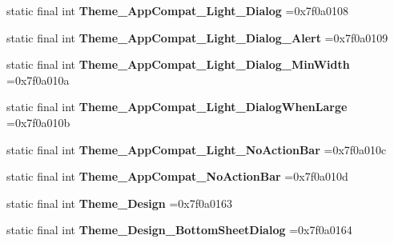 \begin{DoxyCompactItemize}
\item 
\mbox{\label{classproject4_1_1xaria_1_1R_1_1style_aaa524f5b7ae8038afec6da41ae3052c0}} 
static final int {\bfseries Theme\+\_\+\+App\+Compat\+\_\+\+Light\+\_\+\+Dialog} =0x7f0a0108
\item 
\mbox{\label{classproject4_1_1xaria_1_1R_1_1style_a3c1c388a229f2c9ee0b109650884f199}} 
static final int {\bfseries Theme\+\_\+\+App\+Compat\+\_\+\+Light\+\_\+\+Dialog\+\_\+\+Alert} =0x7f0a0109
\item 
\mbox{\label{classproject4_1_1xaria_1_1R_1_1style_ab0a0b62706256c4ed32d64b705a91343}} 
static final int {\bfseries Theme\+\_\+\+App\+Compat\+\_\+\+Light\+\_\+\+Dialog\+\_\+\+Min\+Width} =0x7f0a010a
\item 
\mbox{\label{classproject4_1_1xaria_1_1R_1_1style_a5f61224605a5ee4976c59cb6b3525453}} 
static final int {\bfseries Theme\+\_\+\+App\+Compat\+\_\+\+Light\+\_\+\+Dialog\+When\+Large} =0x7f0a010b
\item 
\mbox{\label{classproject4_1_1xaria_1_1R_1_1style_af020d2f87cb93a81600ffa041b12e570}} 
static final int {\bfseries Theme\+\_\+\+App\+Compat\+\_\+\+Light\+\_\+\+No\+Action\+Bar} =0x7f0a010c
\item 
\mbox{\label{classproject4_1_1xaria_1_1R_1_1style_a52c1c8048e1fbcc0e0284847d9cbf77c}} 
static final int {\bfseries Theme\+\_\+\+App\+Compat\+\_\+\+No\+Action\+Bar} =0x7f0a010d
\item 
\mbox{\label{classproject4_1_1xaria_1_1R_1_1style_a28ebb7745813e79eaf68a6d5dcda7412}} 
static final int {\bfseries Theme\+\_\+\+Design} =0x7f0a0163
\item 
\mbox{\label{classproject4_1_1xaria_1_1R_1_1style_ae8ed145049a6b05998ceeedeb9e032b7}} 
static final int {\bfseries Theme\+\_\+\+Design\+\_\+\+Bottom\+Sheet\+Dialog} =0x7f0a0164
\item 
\mbox{\label{classproject4_1_1xaria_1_1R_1_1style_ae64f22eee96615a706a813e3964719bd}} 

\end{DoxyCompactItemize}
